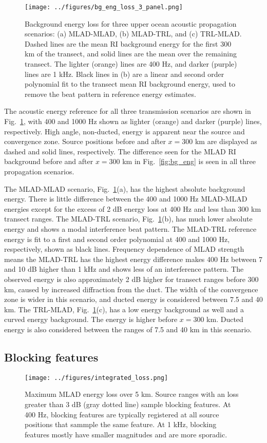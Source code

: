 \documentclass[preprint,NumberedRefs]{JASA}
\begin{document}
\begin{figure}
\texttt{[image: ../figures/bg\_eng\_loss\_3\_panel.png]}
        \caption{Background energy loss for three upper ocean acoustic propagation scenarios: (a) MLAD-MLAD, (b) MLAD-TRL, and (c) TRL-MLAD. Dashed lines are the mean RI background energy for the first 300 km of the transect, and solid lines are the mean over the remaining transect. The lighter (orange) lines are 400 Hz, and darker (purple) lines are 1 kHz. Black lines in (b) are a linear and second order polynomial fit to the transect mean RI background energy, used to remove the beat pattern in reference energy estimates.}
    \label{fig:eng_bg_3}
\end{figure}
The acoustic energy reference for all three transmission scenarios are shown in Fig.~\ref{fig:eng_bg_3}, with 400 and 1000 Hz shown as lighter (orange) and darker (purple) lines, respectively. High angle, non-ducted, energy is apparent near the source and convergence zone. Source positions before and after $x=300$ km are displayed as dashed and solid lines, respectively. The difference seen for the MLAD RI background before and after $x=300$ km in Fig.~\ref{fig:bg_eng} is seen in all three propagation scenarios.

The MLAD-MLAD scenario, Fig.~\ref{fig:eng_bg_3}(a), has the highest absolute background energy. There is little difference between the 400 and 1000 Hz MLAD-MLAD energies except for the excess of 2 dB energy loss at 400 Hz and less than 300 km transect ranges. The MLAD-TRL scenario, Fig.~\ref{fig:eng_bg_3}(b), has much lower absolute energy and shows a modal interference beat pattern. The MLAD-TRL reference energy is fit to a first and second order polynomial at 400 and 1000 Hz, respectively, shown as black lines. Frequency dependence of MLAD strength means the MLAD-TRL has the highest energy difference makes 400 Hz between 7 and 10 dB higher than 1 kHz and shows less of an interference pattern. The observed energy is also approximately 2 dB higher for transect ranges before 300 km, caused by increased diffraction from the duct. The width of the convergence zone is wider in this scenario, and ducted energy is considered between 7.5 and 40 km. The TRL-MLAD, Fig.~\ref{fig:eng_bg_3}(c), has a low energy background as well and a curved energy background. The energy is higher before $x=300$ km. Ducted energy is also considered between the ranges of 7.5 and 40 km in this scenario.

\subsection{Blocking features}\label{ssec:blocking}
\begin{figure}
\texttt{[image: ../figures/integrated\_loss.png]}
    \caption{Maximum MLAD energy loss over 5 km. Source ranges with an loss greater than 3 dB (gray dotted line) sample blocking features. At 400 Hz, blocking features are typically registered at all source positions that sammple the same feature. At 1 kHz, blocking features mostly have smaller magnitudes and are more sporadic.}
    \label{fig:blocking}
\end{figure}
\end{document}
